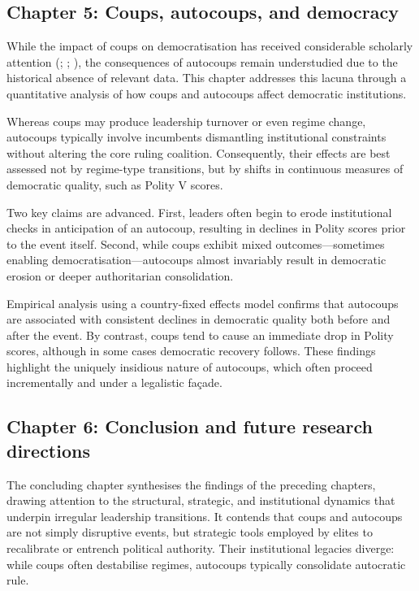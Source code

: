 \documentclass[
  12pt,
]{report}
\begin{document}
\subsection*{Chapter 5: Coups, autocoups, and
democracy}\label{chapter-5-coups-autocoups-and-democracy}

While the impact of coups on democratisation has received considerable
scholarly attention (; ;
), the consequences of
autocoups remain understudied due to the historical absence of relevant
data. This chapter addresses this lacuna through a quantitative analysis
of how coups and autocoups affect democratic institutions.

Whereas coups may produce leadership turnover or even regime change,
autocoups typically involve incumbents dismantling institutional
constraints without altering the core ruling coalition. Consequently,
their effects are best assessed not by regime-type transitions, but by
shifts in continuous measures of democratic quality, such as Polity V
scores.

Two key claims are advanced. First, leaders often begin to erode
institutional checks in anticipation of an autocoup, resulting in
declines in Polity scores prior to the event itself. Second, while coups
exhibit mixed outcomes---sometimes enabling democratisation---autocoups
almost invariably result in democratic erosion or deeper authoritarian
consolidation.

Empirical analysis using a country-fixed effects model confirms that
autocoups are associated with consistent declines in democratic quality
both before and after the event. By contrast, coups tend to cause an
immediate drop in Polity scores, although in some cases democratic
recovery follows. These findings highlight the uniquely insidious nature
of autocoups, which often proceed incrementally and under a legalistic
façade.

\subsection*{Chapter 6: Conclusion and future research
directions}\label{chapter-6-conclusion-and-future-research-directions}

The concluding chapter synthesises the findings of the preceding
chapters, drawing attention to the structural, strategic, and
institutional dynamics that underpin irregular leadership transitions.
It contends that coups and autocoups are not simply disruptive events,
but strategic tools employed by elites to recalibrate or entrench
political authority. Their institutional legacies diverge: while coups
often destabilise regimes, autocoups typically consolidate autocratic
rule.
\end{document}
